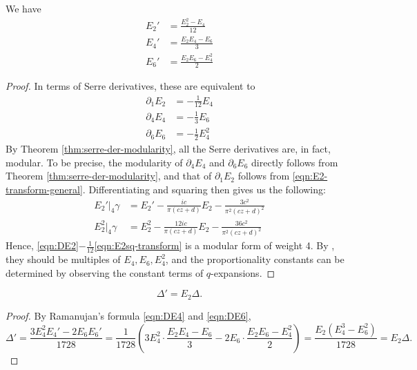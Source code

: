 \begin{theorem}\label{thm:ramanujan-formula}  \leanok
We have
\begin{align}
    E_2' &= \frac{E_2^2 - E_4}{12} \label{eqn:DE2} \\
    E_4' &= \frac{E_2 E_4 - E_6}{3} \label{eqn:DE4} \\
    E_6' &= \frac{E_2 E_6 - E_4^2}{2} \label{eqn:DE6}
\end{align}
\end{theorem}
\begin{proof}
In terms of Serre derivatives, these are equivalent to
\begin{align}
    \partial_{1}E_2 &= -\frac{1}{12} E_4 \label{eqn:SE2} \\
    \partial_{4}E_4 &= -\frac{1}{3} E_6 \label{eqn:SE4} \\
    \partial_{6}E_6 &= -\frac{1}{2} E_4^2 \label{eqn:SE6}
\end{align}
By Theorem \ref{thm:serre-der-modularity}, all the Serre derivatives are, in fact, modular.
To be precise, the modularity of $\partial_{4} E_4$ and $\partial_6 E_6$ directly follows from Theorem \ref{thm:serre-der-modularity}, and that of $\partial_{1}E_2$ follows from \eqref{eqn:E2-transform-general}.
Differentiating and squaring then gives us the following:
\begin{align}
    E_2'|_{4}\gamma &= E_2' - \frac{ic}{\pi(cz + d)} E_2 - \frac{3c^2}{\pi^2 (cz + d)^2} \label{eqn:DE2-transform} \\
    E_2^2|_{4}\gamma &= E_2^2 - \frac{12ic}{\pi(cz + d)} E_2 - \frac{36c^2}{\pi^2 (cz + d)^2} \label{eqn:E2sq-transform}
\end{align}
Hence, \eqref{eqn:DE2}$-\frac{1}{12}$\eqref{eqn:E2sq-transform} is a modular form of weight 4.
By , they should be multiples of $E_4, E_6, E_4^2$, and the proportionality constants can be determined by observing the constant terms of $q$-expansions.
\end{proof}
\begin{corollary}\label{cor:logder-disc-E2}
\begin{equation}\label{eqn:logder-disc-E2}
    \Delta' = E_2 \Delta.
\end{equation}
\end{corollary}
\begin{proof}
By Ramanujan's formula \eqref{eqn:DE4} and \eqref{eqn:DE6},
\begin{equation}
\Delta' = \frac{3 E_4^2 E_4' - 2 E_6 E_6'}{1728} = \frac{1}{1728} \left(3 E_4^2 \cdot \frac{E_2 E_4 - E_6}{3} - 2 E_6 \cdot \frac{E_2 E_6 - E_4^2}{2}\right) = \frac{E_2(E_4^3 - E_6^2)}{1728} = E_2\Delta.
\end{equation}
\end{proof}

